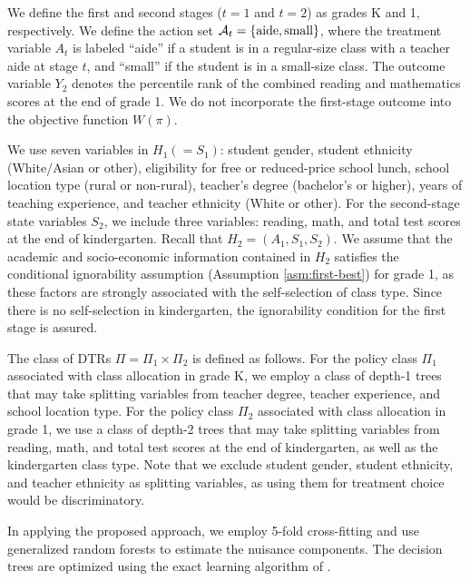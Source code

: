 We define the first and second stages ($t=1$ and $t=2$) as grades K and 1, respectively. 
We define the action set $\mathcal{A}_{t} = \{\text{aide},\text{small}\}$,
where the treatment variable $A_{t}$ is labeled ``aide'' if a student is in a regular-size class with a teacher aide at stage $t$, and ``small'' if the student is in a small-size class. The outcome variable $Y_2$ denotes the percentile rank of the combined reading and mathematics scores at the end of grade 1.
We do not incorporate the first-stage outcome into the objective function $W(\pi)$.

We use seven variables in $H_1 (=S_{1})$: student gender, student ethnicity (White/Asian or other), eligibility for free or reduced-price school lunch, school location type (rural or non-rural), teacher’s degree (bachelor’s or higher), years of teaching experience, and teacher ethnicity (White or other). For the second-stage state variables $S_{2}$, we include three variables: reading, math, and total test scores at the end of kindergarten. Recall that $H_2 = (A_1, S_1, S_2)$. We assume that the academic and socio-economic information contained in $H_2$ satisfies the conditional ignorability assumption (Assumption \ref{asm:first-best}) for grade 1, as these factors are strongly associated with the self-selection of class type.  Since there is no self-selection in kindergarten, the ignorability condition for the first stage is assured.


The class of DTRs $ \Pi = \Pi_1 \times \Pi_2$ is defined as follows. For the policy class $\Pi_1$ associated with class allocation in grade K, we employ a class of depth-1 trees that may take splitting variables from teacher degree, teacher experience, and school location type. For the policy class $\Pi_2$ associated with class allocation in grade 1, we use a class of depth-2 trees that may take splitting variables from reading, math, and total test scores at the end of kindergarten, as well as the kindergarten class type. Note that we exclude student gender, student ethnicity, and teacher ethnicity as splitting variables, as using them for treatment choice would be discriminatory. 


In applying the proposed approach, we employ 5-fold cross-fitting and use generalized random forests \citep{Athey_et_al_2019} to estimate the nuisance components. The decision trees are optimized using the exact learning algorithm of \cite{zhou2022offline}.



